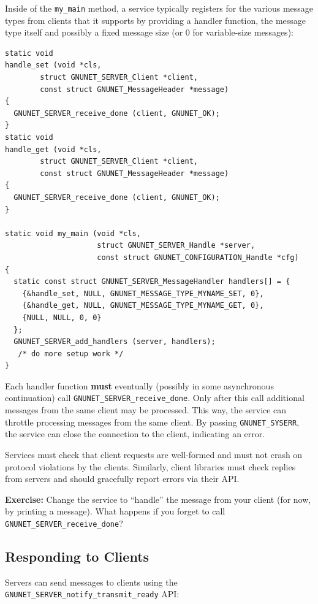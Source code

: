 \documentclass[10pt]{article}
\newcommand{\exercise}[1]{\noindent\begin{boxedminipage}{\textwidth}{\bf Exercise:} #1 \end{boxedminipage}}
\begin{document}
Inside of the {\tt my\_main} method, a service typically registers for
the various message types from clients that it supports by providing
a handler function, the message type itself and possibly a fixed
message size (or 0 for variable-size messages):

\lstset{language=c}
\begin{lstlisting}
static void
handle_set (void *cls,
	    struct GNUNET_SERVER_Client *client,
	    const struct GNUNET_MessageHeader *message)
{
  GNUNET_SERVER_receive_done (client, GNUNET_OK);
}
static void
handle_get (void *cls,
	    struct GNUNET_SERVER_Client *client,
	    const struct GNUNET_MessageHeader *message)
{
  GNUNET_SERVER_receive_done (client, GNUNET_OK);
}

static void my_main (void *cls,
                     struct GNUNET_SERVER_Handle *server,
                     const struct GNUNET_CONFIGURATION_Handle *cfg)
{
  static const struct GNUNET_SERVER_MessageHandler handlers[] = {
    {&handle_set, NULL, GNUNET_MESSAGE_TYPE_MYNAME_SET, 0},
    {&handle_get, NULL, GNUNET_MESSAGE_TYPE_MYNAME_GET, 0},
    {NULL, NULL, 0, 0}
  };
  GNUNET_SERVER_add_handlers (server, handlers);
   /* do more setup work */
}
\end{lstlisting}

Each handler function {\bf must} eventually (possibly in some
asynchronous continuation) call {\tt GNUNET\_SERVER\_receive\_done}.
Only after this call additional messages from the same client may
be processed. This way, the service can throttle processing messages
from the same client.  By passing {\tt GNUNET\_SYSERR}, the service
can close the connection to the client, indicating an error.

Services must check that client requests are well-formed and must not
crash on protocol violations by the clients.  Similarly, client
libraries must check replies from servers and should gracefully report
errors via their API.


\exercise{Change the service to ``handle'' the message from your
client (for now, by printing a message).  What happens if you
forget to call {\tt GNUNET\_SERVER\_receive\_done}?}


\subsection{Responding to Clients}

Servers can send messages to clients using the
{\tt GNUNET\_SERVER\_notify\_transmit\_ready} API:
\end{document}
